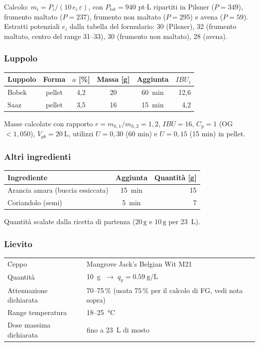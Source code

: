 \noindent Calcolo: $m_i = P_i / (10\, e_i\, \varepsilon)$, con $P_{tot} = 940$ pt$\cdot$L ripartiti in Pilsner ($P = 349$), frumento maltato ($P = 237$), frumento non maltato ($P = 295$) e avena ($P = 59$). Estratti potenziali $e_i$ dalla tabella del formulario: 30 (Pilsner), 32 (frumento maltato, centro del range 31--33), 30 (frumento non maltato), 28 (avena).

\subsubsection*{Luppolo}
\begin{tabularx}{\linewidth}{@{}Xccccr@{}}
\toprule
Luppolo & Forma & $a$ [\si{\percent}] & Massa [\si{\gram}] & Aggiunta & $IBU_i$ \\
\midrule
Bobek & pellet & 4,2 & 20 & \SI{60}{\minute} & 12,6 \\
Saaz & pellet & 3,5 & 16 & \SI{15}{\minute} & 4,2 \\
\bottomrule
\end{tabularx}

\noindent Masse calcolate con rapporto $r = m_{h,1}/m_{h,2} = 1{,}2$, $IBU = 16$, $C_g = 1$ (OG $< 1{,}050$), $V_{pb} = \SI{20}{\liter}$, utilizzi $U=0{,}30$ (60 min) e $U=0{,}15$ (15 min) in pellet.

\subsubsection*{Altri ingredienti}
\begin{tabularx}{\linewidth}{@{}Xcr@{}}
\toprule
Ingrediente & Aggiunta & Quantità [\si{\gram}] \\
\midrule
Arancia amara (buccia essiccata) & \SI{15}{\minute} & 15 \\
Coriandolo (semi) & \SI{5}{\minute} & 7 \\
\bottomrule
\end{tabularx}

\noindent Quantità scalate dalla ricetta di partenza ($20\,\mathrm{g}$ e $10\,\mathrm{g}$ per \SI{23}{\liter}).

\subsubsection*{Lievito}
\begin{tabularx}{\linewidth}{@{}lX@{}}
\toprule
Ceppo & Mangrove Jack's Belgian Wit M21 \\
Quantità & \SI{10}{\gram} $\;\to\; q_y = \SI{0,59}{\gram\per\liter}$ \\
Attenuazione dichiarata & 70--75\,\% (usata $75$\,\% per il calcolo di FG, vedi nota sopra) \\
Range temperatura & 18--\SI{25}{\celsius} \\
Dose massima dichiarata & fino a \SI{23}{\liter} di mosto \\
\bottomrule
\end{tabularx}

